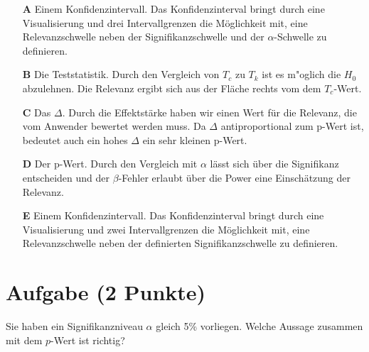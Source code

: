 \documentclass[a4paper, 9pt]{scrartcl}\usepackage[]{graphicx}\usepackage[]{xcolor}
\begin{document}
\begin{enumerate}
\item [\textbf{A} \msquare] Einem Konfidenzintervall. Das Konfidenzinterval bringt durch eine Visualisierung und drei Intervallgrenzen die Möglichkeit mit, eine Relevanzschwelle neben der Signifikanzschwelle und der $\alpha$-Schwelle zu definieren.
\item [\textbf{B} \msquare] Die Teststatistik. Durch den Vergleich von $T_c$ zu $T_k$ ist es m{"o}glich die $H_0$ abzulehnen. Die Relevanz ergibt sich aus der Fläche rechts vom dem $T_c$-Wert.
\item [\textbf{C} \msquare] Das $\Delta$. Durch die Effektstärke haben wir einen Wert für die Relevanz, die vom Anwender bewertet werden muss. Da $\Delta$ antiproportional zum p-Wert ist, bedeutet auch ein hohes $\Delta$ ein sehr kleinen p-Wert.
\item [\textbf{D} \msquare] Der p-Wert. Durch den Vergleich mit $\alpha$ lässt sich über die Signifikanz entscheiden und der $\beta$-Fehler erlaubt über die Power eine Einschätzung der Relevanz.
\item [\textbf{E} \msquare] Einem Konfidenzintervall. Das Konfidenzinterval bringt durch eine Visualisierung und zwei Intervallgrenzen die Möglichkeit mit, eine Relevanzschwelle neben der definierten Signifikanzschwelle zu definieren.
\end{enumerate}

\section{Aufgabe \hfill (2 Punkte)}



Sie haben ein Signifikanzniveau $\alpha$ gleich 5\% vorliegen. Welche Aussage zusammen mit dem $p$-Wert ist richtig?
\end{document}
